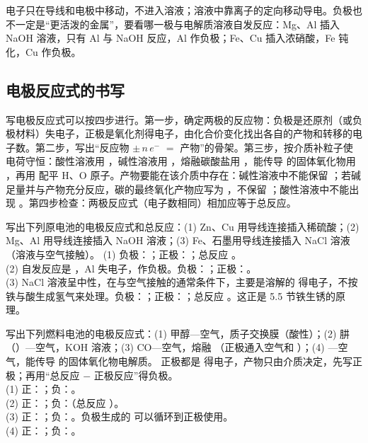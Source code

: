 \begin{yicuo}
电子只在导线和电极中移动，不进入溶液；溶液中靠离子的定向移动导电。负极也不一定是“更活泼的金属”，要看哪一极与电解质溶液自发反应：Mg、Al 插入 NaOH 溶液，只有 Al 与 NaOH 反应，Al 作负极；Fe、Cu 插入浓硝酸，Fe 钝化，Cu 作负极。
\end{yicuo}

\subsection{电极反应式的书写}
写电极反应式可以按四步进行。第一步，确定两极的反应物：负极是还原剂（或负极材料）失电子，正极是氧化剂得电子，由化合价变化找出各自的产物和转移的电子数。第二步，写出“反应物 $\pm\,n\,e^-$ $=$ 产物”的骨架。第三步，按介质补粒子使电荷守恒：酸性溶液用 ，碱性溶液用 ，熔融碳酸盐用 ，能传导  的固体氧化物用 ，再用  配平 H、O 原子。产物要能在该介质中存在：碱性溶液中不能保留 ；若碱足量并与产物充分反应，碳的最终氧化产物应写为 ，不保留 ；酸性溶液中不能出现 。第四步检查：两极反应式（电子数相同）相加应等于总反应。

\begin{liti}[基础]
写出下列原电池的电极反应式和总反应：(1) Zn、Cu 用导线连接插入稀硫酸；(2) Mg、Al 用导线连接插入 NaOH 溶液；(3) Fe、石墨用导线连接插入 NaCl 溶液（溶液与空气接触）。
\tcblower
\jie (1) 负极：；正极：；总反应 。\\
(2) 自发反应是 ，Al 失电子，作负极。负极：；正极：。\\
(3) NaCl 溶液呈中性，在与空气接触的通常条件下，主要是溶解的  得电子，不按铁与酸生成氢气来处理。负极：；正极：；总反应 。这正是 5.5 节铁生锈的原理。
\end{liti}

\begin{liti}[典型]
写出下列燃料电池的电极反应式：(1) 甲醇—空气，质子交换膜（酸性）；(2) 肼（）—空气，KOH 溶液；(3) CO—空气，熔融 （正极通入空气和 ）；(4) —空气，能传导  的固体氧化物电解质。
\tcblower
\silu 正极都是  得电子，产物只由介质决定，先写正极；再用“总反应 $-$ 正极反应”得负极。\\
\jie (1) 正：；负：。\\
(2) 正：；负：（总反应 ）。\\
(3) 正：；负：。负极生成的  可以循环到正极使用。\\
(4) 正：；负：。
\end{liti}

